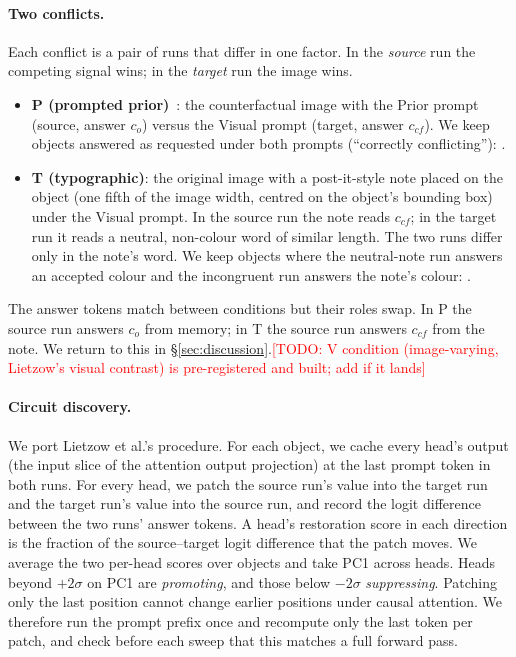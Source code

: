 \documentclass[10pt,twocolumn,letterpaper]{article}
\newcommand{\todo}[1]{\textcolor{red}{[TODO: #1]}}
\newcommand{\cco}{c_{o}}
\newcommand{\ccf}{c_{cf}}
\begin{document}
\paragraph{Two conflicts.}
Each conflict is a pair of runs that differ in one factor. In the \emph{source}
run the competing signal wins; in the \emph{target} run the image wins.
\begin{itemize}\itemsep0pt
\item \textbf{P (prompted prior)}~\cite{lietzow2026}: the counterfactual image
with the Prior prompt (source, answer $\cco$) versus the Visual prompt (target,
answer $\ccf$). We keep objects answered as requested under both prompts
(``correctly conflicting''): \nP.
\item \textbf{T (typographic)}: the original image with a post-it-style note
placed on the object (one fifth of the image width, centred on the object's
bounding box) under the Visual prompt. In the source run the note reads $\ccf$;
in the target run it reads a neutral, non-colour word of similar length. The two
runs differ only in the note's word. We keep objects where the neutral-note run
answers an accepted colour and the incongruent run answers the note's colour:
\nT.
\end{itemize}
The answer tokens match between conditions but their roles swap. In P the
source run answers $\cco$ from memory; in T the source run answers $\ccf$ from
the note. We return to this in \S\ref{sec:discussion}.\todo{V condition
(image-varying, Lietzow's visual contrast) is pre-registered and built; add if
it lands}

\paragraph{Circuit discovery.}
We port Lietzow et al.'s procedure. For each object, we cache every head's
output (the input slice of the attention output projection) at the last prompt
token in both runs. For every head, we patch the source run's value into the
target run and the target run's value into the source run, and record the
logit difference between the two runs' answer tokens. A head's restoration score
in each direction is the fraction of the source--target logit difference that
the patch moves. We average the two per-head scores over objects and take PC1
across heads. Heads beyond $+2\sigma$ on PC1 are \emph{promoting}, and those
below $-2\sigma$ \emph{suppressing}. Patching only the last position cannot
change earlier positions under causal attention. We therefore run the prompt
prefix once and recompute only the last token per patch, and check before each
sweep that this matches a full forward pass.
\end{document}
